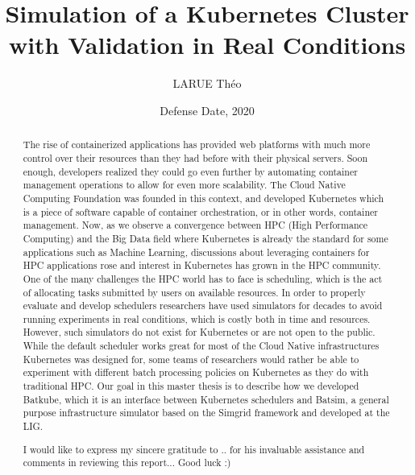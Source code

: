 \documentclass[12pt, a4paper]{memoir}
\title{Simulation of a Kubernetes Cluster with Validation in Real Conditions} %
\author{LARUE Théo}
\date{Defense Date, 2020} %
\begin{document}
\frontmatter
\begin{titlingpage}
\maketitle
\end{titlingpage}

\setlength{\parskip}{-1pt plus 1pt}

\renewcommand{\abstracttextfont}{\normalfont}
\abstractintoc
\begin{abstract} 
	The rise of containerized applications has provided web platforms with
	much more control over their resources than they had before with their
	physical servers. Soon enough, developers realized they could go even
	further by automating container management operations to allow for even
	more scalability. The Cloud Native Computing Foundation was founded in
	this context, and developed Kubernetes which is a piece of software
	capable of container orchestration, or in other words, container
	management. Now, as we observe a convergence between HPC (High
	Performance Computing) and the Big Data field where Kubernetes is
	already the standard for some applications such as Machine Learning,
	discussions about leveraging containers for HPC applications rose and
	interest in Kubernetes has grown in the HPC community. One of the many
	challenges the HPC world has to face is scheduling, which is the act of
	allocating tasks submitted by users on available resources. In order to
	properly evaluate and develop schedulers researchers have used
	simulators for decades to avoid running experiments in real conditions,
	which is costly both in time and resources. However, such simulators do
	not exist for Kubernetes or are not open to the public. While the
	default scheduler works great for most of the Cloud Native
	infrastructures Kubernetes was designed for, some teams of researchers
	would rather be able to experiment with different batch processing
	policies on Kubernetes as they do with traditional HPC. Our goal in
	this master thesis is to describe how we developed Batkube, which it is
	an interface between Kubernetes schedulers and Batsim, a general
	purpose infrastructure simulator based on the Simgrid framework and
	developed at the LIG.

\end{abstract}
\abstractintoc

\renewcommand\abstractname{Acknowledgement}
\begin{abstract}
I would like to express my sincere gratitude to .. for his invaluable assistance and comments in reviewing this report... 
Good luck :) 
\end{abstract}
\end{document}
